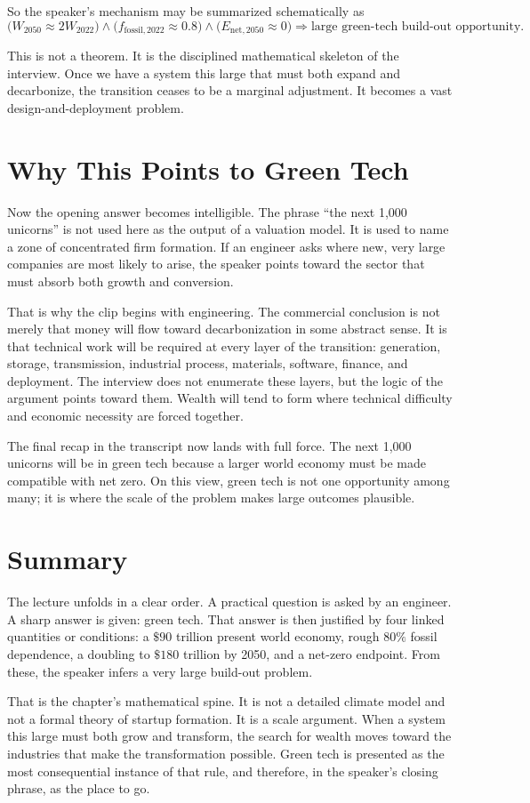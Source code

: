 So the speaker's mechanism may be summarized schematically as
\begin{equation}
\bigl(W_{2050} \approx 2W_{2022}\bigr)
\land
\bigl(f_{\mathrm{fossil},2022} \approx 0.8\bigr)
\land
\bigl(E_{\mathrm{net},2050} \approx 0\bigr)
\Rightarrow
\text{large green-tech build-out opportunity}.
\end{equation}

This is not a theorem. It is the disciplined mathematical skeleton of the interview. Once we have a system this large that must both expand and decarbonize, the transition ceases to be a marginal adjustment. It becomes a vast design-and-deployment problem.

\section{Why This Points to Green Tech}

Now the opening answer becomes intelligible. The phrase ``the next 1{,}000 unicorns'' is not used here as the output of a valuation model. It is used to name a zone of concentrated firm formation. If an engineer asks where new, very large companies are most likely to arise, the speaker points toward the sector that must absorb both growth and conversion.

That is why the clip begins with engineering. The commercial conclusion is not merely that money will flow toward decarbonization in some abstract sense. It is that technical work will be required at every layer of the transition: generation, storage, transmission, industrial process, materials, software, finance, and deployment. The interview does not enumerate these layers, but the logic of the argument points toward them. Wealth will tend to form where technical difficulty and economic necessity are forced together.

The final recap in the transcript now lands with full force. The next 1{,}000 unicorns will be in green tech because a larger world economy must be made compatible with net zero. On this view, green tech is not one opportunity among many; it is where the scale of the problem makes large outcomes plausible.

\section{Summary}

The lecture unfolds in a clear order. A practical question is asked by an engineer. A sharp answer is given: green tech. That answer is then justified by four linked quantities or conditions: a \(\$90\) trillion present world economy, rough \(80\%\) fossil dependence, a doubling to \(\$180\) trillion by 2050, and a net-zero endpoint. From these, the speaker infers a very large build-out problem.

That is the chapter's mathematical spine. It is not a detailed climate model and not a formal theory of startup formation. It is a scale argument. When a system this large must both grow and transform, the search for wealth moves toward the industries that make the transformation possible. Green tech is presented as the most consequential instance of that rule, and therefore, in the speaker's closing phrase, as the place to go.